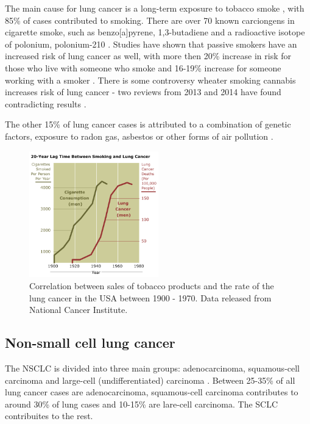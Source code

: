 \documentclass[type=dr, dr=rernat, accentcolor=tud7b,colorbacktitle, bigchapter, openright, twoside, 12pt ]{tudthesis}
\begin{document}
The main cause for lung cancer is a long-term exposure to tobacco smoke \cite{Tsao2008}, with 85\% of cases contributed to smoking. There are over 70 known carciongens in cigarette smoke, such as benzo[a]pyrene, 1,3-butadiene and a radioactive isotope of polonium, polonium-210 \cite{Hecht2012}.
Studies have shown that passive smokers have an increased risk of lung cancer as well, with more then 20\% increase in risk for those who live with someone who smoke and 16-19\% increase for someone working with a smoker \cite{Taylor2007}.
There is some controversy wheater smoking cannabis increases risk of lung cancer - two reviews from 2013 and 2014 have found contradicting results \cite{Tasckin2013, Underner2014}.

The other 15\% of lung cancer cases is attributed to a combination of genetic factors, exposure to radon gas, asbestos or other forms of air pollution \cite{Alberg2010}.

\begin{figure}[H]
	\begin{center}
		\includegraphics[width=0.5\textwidth]{./Images/Smoking.png}
		\caption{Correlation between sales of tobacco products and the rate of the lung cancer in the USA between 1900 - 1970. Data released from National Cancer Institute.}
		\label{Fig:Stages}
	\end{center}
\end{figure}


\subsection{Non-small cell lung cancer}

The NSCLC is divided into three main groups: adenocarcinoma, squamous-cell carcinoma and large-cell (undifferentiated) carcinoma \cite{Kasper2015}.
Between 25-35\% of all lung cancer cases are adenocarcinoma, squamous-cell carcinoma contributes to around 30\% of lung cases and 10-15\% are lare-cell carcinoma. The SCLC contribuites to the rest. 
\end{document}
